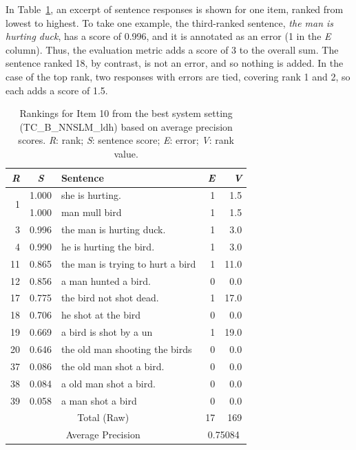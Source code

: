 In Table~\ref{tab:i10responses-avgprec}, an excerpt of sentence
responses is shown for one item, ranked from lowest to highest.  To
take one example, the third-ranked sentence, \textit{the man is hurting duck}, has a score of 0.996, and it is annotated as an error (1 in
the \textit{E} column).  Thus, the evaluation metric adds a score of 3
to the overall sum.  The sentence ranked 18, by contrast, is not an
error, and so nothing is added.  In the case of the top rank, two
responses with errors are tied, covering rank 1 and 2, so each adds a score of 1.5.

\begin{table}[htb!]
\begin{center}
\setlength{\tabcolsep}{0.3em}
\begin{tabular}{|r|c|l|r|r|}
\hline
\textit{R} & \textit{S} & Sentence & \textit{E} & \textit{V}\\
\hline
\hline
\multirow{2}{*}{1} & 1.000 & she is hurting. & 1 & 1.5 \\
& 1.000 & man mull bird & 1 & 1.5 \\
\hline
3 & 0.996 & the man is hurting duck. & 1 & 3.0 \\
4 & 0.990 & he is hurting the bird. & 1 & 3.0 \\
\hline
11 & 0.865 & the man is trying to hurt a bird & 1 & 11.0 \\
12 & 0.856 & a man hunted a bird. & 0 & 0.0 \\
\hline
17 & 0.775 & the bird not shot dead.  & 1 & 17.0 \\
18 & 0.706 & he shot at the bird & 0 & 0.0 \\
19 & 0.669 & a bird is shot by a un & 1 & 19.0 \\
20 & 0.646 & the old man shooting the birds & 0 & 0.0 \\
\hline
37 & 0.086 & the old man shot a bird. & 0 & 0.0 \\
38 & 0.084 & a old man shot a bird. & 0 & 0.0 \\
39 & 0.058 & a man shot a bird & 0 & 0.0 \\
\hline
\hline
\multicolumn{3}{|c|}{Total (Raw)} & 17 & 169 \\
\hline
\multicolumn{3}{|c|}{Average Precision} & \multicolumn{2}{c|}{0.75084} \\
\hline
\end{tabular}
\caption{Rankings for Item 10 from the best system setting (TC\_B\_NNSLM\_ldh) based on average precision scores. \textit{R}: rank; \textit{S}: sentence score; \textit{E}: error; \textit{V}: rank value. }
\label{tab:i10responses-avgprec}
\end{center}
\end{table}

